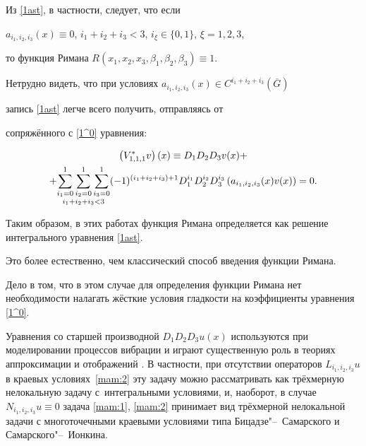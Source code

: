 Из  \eqref{1ast}, в частности, следует, что если

$a_{i_1 ,i_2 ,i_3 }(x)\equiv 0$, $i_1 +i_2 +i_3 <3$, $i_\xi \in\{0, 1\}$, $\xi =1, 2, 3$,

то функция Римана $R\left( x_1 ,x_2 ,x_3 ,\beta _1 ,\beta _2 ,\beta _3 \right) \equiv 1$.

Нетрудно видеть, что при условиях $a_{i_1 ,i_2 ,i_3 }(x)\in C^{i_1 +i_2 +i_3 }( \overline{G})$

запись \eqref{1ast} легче всего получить, отправляясь от

сопряжённого с \eqref{1^0} уравнения:

\begin{multline*}

\left( V_{1, 1, 1}^{\ast }v\right) (x)\equiv D_1 D_2 D_3 v(x)+


\\

+\underset{%

i_1 +i_2 +i_3 <3}{\sum\limits_{i_1 =0}^1\sum\limits_{i_2 =0}^1\sum\limits_{i_3 =0}^1}(-1)^{\left( i_1 +i_2 +i_3 \right)

+1}D_1 ^{i_1 }D_2 ^{i_2 }D_3 ^{i_3 }\left(

a_{i_1 ,i_2 ,i_3 }(x)v(x)\right) =0.

\end{multline*}



Таким образом, в этих работах функция Римана определяется как решение интегрального уравнения \eqref{1ast}.

Это более естественно, чем классический способ введения функции Римана. 

Дело в том, что в этом случае для определения функции Римана нет необходимости налагать жёсткие условия гладкости на коэффициенты уравнения \eqref{1^0}.



Уравнения со старшей производной $D_1D_2D_3u(x)$ используются при моделировании процессов вибрации \cite[с. 63]{mam:bib:7} и играют существенную роль в теориях аппроксимации и отображений \cite[с. 109]{mam:bib:7}. В частности, при отсутствии операторов $L_{i_1,i_2,i_3}u$ в краевых условиях~\eqref{mam:2} эту задачу можно рассматривать как трёхмерную нелокальную задачу с~интегральными условиями, и, наоборот, в случае $N_{i_1,i_2,i_3}u\equiv 0$ задача \eqref{mam:1}, \eqref{mam:2} принимает вид трёхмерной нелокальной задачи с многоточечными краевыми условиями типа Бицадзе"--~Самарского и Самарского"--~Ионкина.

